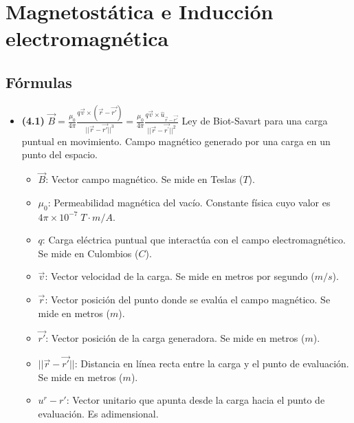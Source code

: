 \documentclass{article}
\begin{document}
	\section{Magnetostática e Inducción electromagnética}
		\subsection*{Fórmulas}
			\begin{itemize}
				\item \textbf{(4.1)} $\boxed{\vec{B}=\frac{\mu_0}{4 \pi} \frac{q \vec{v} \times (\vec{r} - \vec{r'})}{||\vec{r}-\vec{r'}||^3}=\frac{\mu_{0}}{4\pi}\frac{q\vec{v}\times\hat{u}_{\vec{r}-\vec{r'}}}{||\vec{r}-\vec{r^{\prime}}||^{2}}}$ Ley de Biot-Savart para una carga puntual en movimiento. Campo magnético generado por una carga en un punto del espacio.
					\begin{itemize}
						\item $\vec{B}$: Vector campo magnético. Se mide en Teslas ($T$).
						\item $\mu_0$: Permeabilidad magnética del vacío. Constante física cuyo valor es $4 \pi \times 10^{-7} \; T \cdot m/A$.
						\item $q$: Carga eléctrica puntual que interactúa con el campo electromagnético. Se mide en Culombios ($C$).
						\item $\vec{v}$: Vector velocidad de la carga. Se mide en metros por segundo ($m/s$).
						\item $\vec{r}$: Vector posición del punto donde se evalúa el campo magnético. Se mide en metros ($m$). 
						\item $\vec{r'}$: Vector posición de la carga generadora. Se mide en metros ($m$).
						\item $||\vec{r} -  \vec{r'}||$: Distancia en línea recta entre la carga y el punto de evaluación. Se mide en metros ($m$).
						\item $u^r -  r'$: Vector unitario que apunta desde la carga hacia el punto de evaluación. Es adimensional.
					\end{itemize}


\end{itemize}
\end{document}
